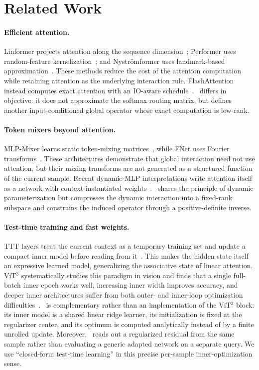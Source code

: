 \section{Related Work}

\paragraph{Efficient attention.}
Linformer projects attention along the sequence dimension~\cite{wang2020linformer}; Performer uses random-feature kernelization~\cite{choromanski2021performer}; and Nystr\"omformer uses landmark-based approximation~\cite{xiong2021nystromformer}. These methods reduce the cost of the attention computation while retaining attention as the underlying interaction rule. FlashAttention instead computes exact attention with an IO-aware schedule~\cite{dao2022flashattention}. \LSSO\ differs in objective: it does not approximate the softmax routing matrix, but defines another input-conditioned global operator whose exact computation is low-rank.

\paragraph{Token mixers beyond attention.}
MLP-Mixer learns static token-mixing matrices~\cite{tolstikhin2021mlpmixer}, while FNet uses Fourier transforms~\cite{lee-thorp2022fnet}. These architectures demonstrate that global interaction need not use attention, but their mixing transforms are not generated as a structured function of the current sample. Recent dynamic-MLP interpretations write attention itself as a network with context-instantiated weights~\cite{lu2026hypermlp,he2026weightformer}. \LSSO\ shares the principle of dynamic parameterization but compresses the dynamic interaction into a fixed-rank subspace and constrains the induced operator through a positive-definite inverse.

\paragraph{Test-time training and fast weights.}
TTT layers treat the current context as a temporary training set and update a
compact inner model before reading from it~\cite{sun2024ttt}. This makes the
hidden state itself an expressive learned model, generalizing the associative
state of linear attention. ViT$^3$ systematically studies this paradigm in
vision and finds that a single full-batch inner epoch works well, increasing
inner width improves accuracy, and deeper inner architectures suffer from both
outer- and inner-loop optimization difficulties~\cite{han2026vit3}. \LSSO\ is
complementary rather than an implementation of the ViT$^3$ block: its inner
model is a shared linear ridge learner, its initialization is fixed at the
regularizer center, and its optimum is computed analytically instead of by a
finite unrolled update. Moreover, \LSSO\ reads out a regularized residual from
the same sample rather than evaluating a generic adapted network on a separate
query. We use ``closed-form test-time learning'' in this precise per-sample
inner-optimization sense.

